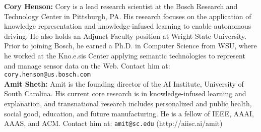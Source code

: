 \documentclass[conference]{IEEEtran}
\begin{document}
\noindent \textbf{Cory Henson:}
Cory is a lead research scientist at the Bosch Research and Technology Center in Pittsburgh, PA. His research focuses on the application of knowledge representation and knowledge-infused learning to enable autonomous driving. He also holds an Adjunct Faculty position at Wright State University. Prior to joining Bosch, he earned a Ph.D. in Computer Science from WSU, where he worked at the Kno.e.sis Center applying semantic technologies to represent and manage sensor data on the Web. Contact him at: \texttt{cory.henson@us.bosch.com} \\

\noindent \textbf{Amit Sheth:} Amit is the founding director of the AI Institute, University of South Carolina. His current core research is in knowledge-infused learning and explanation, and transnational research includes personalized and public health, social good, education, and future manufacturing. He is a fellow of IEEE, AAAI, AAAS, and ACM. Contact him at: \texttt{amit@sc.edu} (http://aiisc.ai/amit)\\
\end{document}
